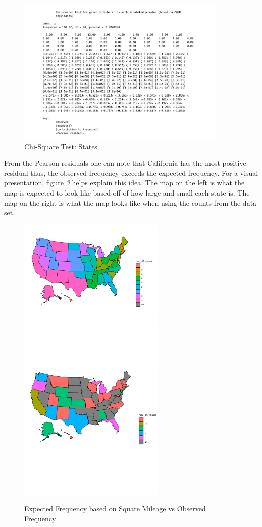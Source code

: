\documentclass[
]{article}
\begin{document}
\begin{figure}
  \caption{Chi-Square Test: States}
    \includegraphics[width=10cm]{chi-state.pdf}
\end{figure}

From the Pearson residuals one can note that California has the most
positive residual thus, the observed frequency exceeds the expected
frequency. For a visual presentation, figure \emph{3} helps explain this
idea. The map on the left is what the map is expected to look like based
off of how large and small each state is. The map on the right is what
the map looks like when using the counts from the data set.

\begin{figure}
  \caption{Expected Frequency based on Square Mileage vs Observed Frequency}
    \includegraphics[width=7cm]{maps.pdf}
    \includegraphics[width=7cm]{observed-map.pdf}
\end{figure}
\end{document}
